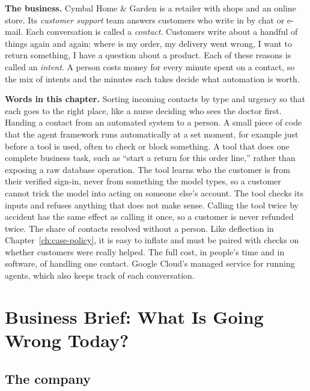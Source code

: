 \begin{beforeyoustart}
\textbf{The business.} Cymbal Home \& Garden is a retailer with shops and an online store. Its \emph{customer support} team answers customers who write in by chat or e-mail. Each conversation is called a \emph{contact}. Customers write about a handful of things again and again: where is my order, my delivery went wrong, I want to return something, I have a question about a product. Each of these reasons is called an \emph{intent}. A person costs money for every minute spent on a contact, so the mix of intents and the minutes each takes decide what automation is worth.

\textbf{Words in this chapter.}
 Sorting incoming contacts by type and urgency so that each goes to the right place, like a nurse deciding who sees the doctor first.
 Handing a contact from an automated system to a person.
 A small piece of code that the agent framework runs automatically at a set moment, for example just before a tool is used, often to check or block something.
 A tool that does one complete business task, such as ``start a return for this order line,'' rather than exposing a raw database operation.
 The tool learns who the customer is from their verified sign-in, never from something the model types, so a customer cannot trick the model into acting on someone else's account.
 The tool checks its inputs and refuses anything that does not make sense.
 Calling the tool twice by accident has the same effect as calling it once, so a customer is never refunded twice.
 The share of contacts resolved without a person. Like deflection in Chapter~\ref{ch:case-policy}, it is easy to inflate and must be paired with checks on whether customers were really helped.
 The full cost, in people's time and in software, of handling one contact.
 Google Cloud's managed service for running agents, which also keeps track of each conversation.
\end{beforeyoustart}


\section{Business Brief: What Is Going Wrong Today?}
\label{sec:support-brief}

\subsection{The company}

